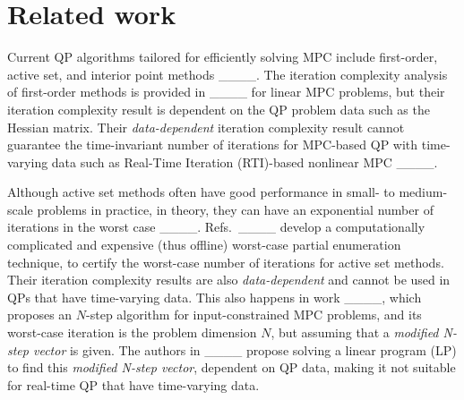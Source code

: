 \section{Related work}
Current QP algorithms tailored for efficiently solving MPC include first-order, active set, and interior point methods ____. The iteration complexity analysis of first-order methods is provided in ____ for linear MPC problems, but their iteration complexity result is dependent on the QP problem data such as the Hessian matrix. Their \textit{data-dependent} iteration complexity result cannot guarantee the time-invariant number of iterations for MPC-based QP with time-varying data such as  Real-Time Iteration (RTI)-based nonlinear MPC ____.

Although active set methods often have good performance in small- to medium-scale problems in practice, in theory, they can have an exponential number of iterations in the worst case ____. Refs.\  ____ develop a computationally complicated and expensive (thus offline) worst-case partial enumeration technique, to certify the worst-case number of iterations for active set methods. Their iteration complexity results are also \textit{data-dependent} and cannot be used in QPs that have time-varying data. This also happens in work ____, which proposes an $N$-step algorithm for input-constrained MPC problems, and its worst-case iteration is the problem dimension $N$, but assuming that a \textit{modified N-step vector} is given. The authors in ____ propose solving a linear program (LP) to find this \textit{modified N-step vector}, dependent on QP data, making it not suitable for real-time QP that have time-varying data.


